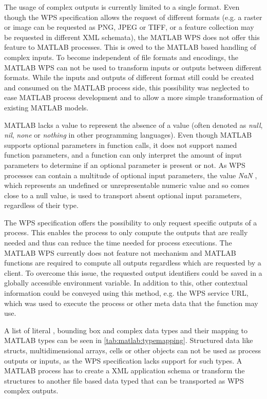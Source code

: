   The usage of complex outputs is currently limited to a single format. Even though the WPS specification allows the request of different formats (e.g. a raster or image can be requested as PNG, JPEG or TIFF, or a feature collection may be requested in different XML schemata), the MATLAB WPS does not offer this feature to MATLAB processes. This is owed to the MATLAB based handling of complex inputs. To become independent of file formats and encodings, the MATLAB WPS can not be used to transform inputs or outputs between different formats. While the inputs and outputs of different format still could be created and consumed on the MATLAB process side, this possibility was neglected to ease MATLAB process development and to allow a more simple transformation of existing MATLAB models.

  MATLAB lacks a value to represent the absence of a value (often denoted as \emph{null}, \emph{nil}, \emph{none} or \emph{nothing} in other programming languages). Even though MATLAB supports optional parameters in function calls, it does not support named function parameters, and a function can only interpret the amount of input parameters to determine if an optional parameter is present or not. As WPS processes can contain a multitude of optional input parameters, the value \emph{NaN} \citep{ieee:754:2008}, which represents an undefined or unrepresentable numeric value and so comes close to a null value, is used to transport absent optional input parameters, regardless of their type.

  The WPS specification offers the possibility to only request specific outputs of a process. This enables the process to only compute the outputs that are really needed and thus can reduce the time needed for process executions. The MATLAB WPS currently does not feature not mechanism and MATLAB functions are required to compute all outputs regardless which are requested by a client.
  To overcome this issue, the requested output identifiers could be saved in a globally accessible environment variable. In addition to this, other contextual information could be conveyed using this method, e.g. the WPS service URL, which was used to execute the process or other meta data that the function may use.

  

  A list of literal \citep[based on][]{w3c:xmldatatypes}, bounding box and complex data types and their mapping to MATLAB types can be seen in \cref{tab:matlab:typemapping}. Structured data like structs, multidimensional arrays, cells or other objects can not be used as process outputs or inputs, as the \ac{WPS} specification lacks support for such types. A MATLAB process has to create a XML application schema or transform the structures to another file based data typed that can be transported as WPS complex outputs.

